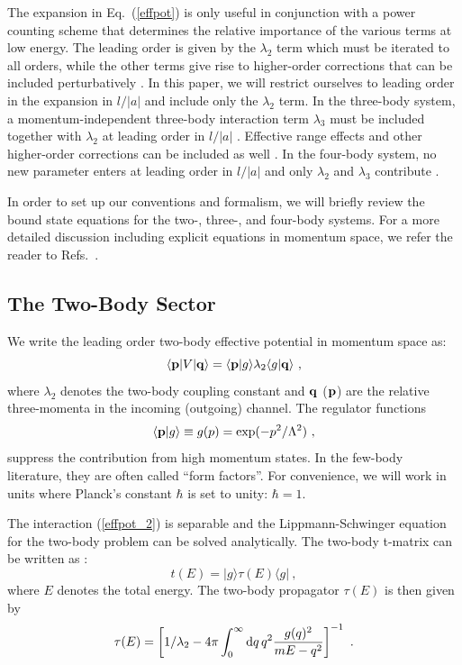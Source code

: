 \documentclass[prc,preprint,showpacs,tightenlines,%
nofootinbib]{revtex4}
\newcommand{\beq}{\begin{equation}}
\newcommand{\eeq}{\end{equation}}
\begin{document}
The expansion in Eq.~(\ref{effpot}) is only useful in conjunction with a 
power counting scheme that determines the relative importance of the various
terms at low energy.
The leading order is given by the $\lambda_2$ term which must 
be iterated to all orders, while the other terms give rise to higher-order
corrections that can be included perturbatively  
\cite{Kaplan:1998tg, vanKolck:1998bw}.
In this paper, we will restrict ourselves to leading order in the 
expansion in $l/|a|$ and include only the $\lambda_2$ term.
In the three-body system, 
a momentum-independent three-body interaction term $\lambda_3$ must be
included together with $\lambda_2$ at leading order  in $l/|a|$
\cite{Bedaque:1998kg,Bedaque:1998km}. 
Effective range effects and other higher-order corrections can be 
included as well 
\cite{Hammer:2001gh,Bedaque:2002yg,Afnan:2003bs,Griesshammer:2004pe,Platter:2006ev,Platter:2006ad}.
In the four-body system, no new parameter enters at leading order
in $l/|a|$ and only $\lambda_2$ and $\lambda_3$ contribute
\cite{Platter04}. 

In order to set up our conventions and formalism,
we will briefly review the bound state equations for the two-,
three-, and four-body systems. For a more detailed discussion including
explicit equations in momentum space, we refer the reader to
Refs.~\cite{Platter04,Lucthesis}.

\subsection{The Two-Body Sector}
\label{sec:effT:2body}
%
We write the leading order two-body effective potential in momentum space as:
\begin{equation}
\langle {\bf p}|V|{\bf q}\rangle=
\langle {\bf p}|g \rangle \lambda_2 \langle g|{\bf q} \rangle ~,
\label{effpot_2}
\end{equation}
where $\lambda_2$ denotes the two-body coupling constant and
${\bf q}$ (${\bf p}$) are the relative three-momenta in the incoming
(outgoing) channel. The regulator functions
\beq
\langle {\bf p}|g\rangle \equiv g(p)=\exp(-p^2/\Lambda^2)~,
\eeq
suppress the contribution from high momentum states. In the few-body 
literature, they are often called ``form factors''. 
For convenience, we will work in units where
Planck's constant $\hbar$ is set to unity: $\hbar=1$.

The interaction (\ref{effpot_2}) is separable and the Lippmann-Schwinger
equation for the two-body problem can be solved analytically.
The two-body t-matrix can be written as \cite{Ziegelmann}:
\begin{equation}
\label{t-matrix}
t(E)=|g\rangle\tau(E)\langle g|~,
\end{equation}
where $E$ denotes the total energy. The two-body propagator $\tau(E)$ is
then given by
\begin{equation}
\tau(E)=\left[1/\lambda_2-4\pi\int_0^\infty\hbox{d}q\,
  q^2\frac{g(q)^2}{mE-q^2}\right]^{-1}~.
\end{equation}
\end{document}
